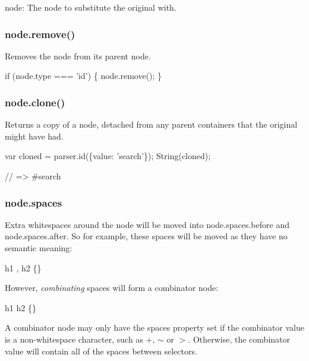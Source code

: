\begin{DoxyItemize}
\item {\ttfamily node}\+: The node to substitute the original with.
\end{DoxyItemize}

\subsubsection*{{\ttfamily node.\+remove()}}

Removes the node from its parent node.


\begin{DoxyCode}
if (node.type === 'id') \{
    node.remove();
\}
\end{DoxyCode}


\subsubsection*{{\ttfamily node.\+clone()}}

Returns a copy of a node, detached from any parent containers that the original might have had.


\begin{DoxyCode}
var cloned = parser.id(\{value: 'search'\});
String(cloned);

// => #search
\end{DoxyCode}


\subsubsection*{{\ttfamily node.\+spaces}}

Extra whitespaces around the node will be moved into {\ttfamily node.\+spaces.\+before} and {\ttfamily node.\+spaces.\+after}. So for example, these spaces will be moved as they have no semantic meaning\+:


\begin{DoxyCode}
h1     ,     h2   \{\}
\end{DoxyCode}


However, {\itshape combinating} spaces will form a {\ttfamily combinator} node\+:


\begin{DoxyCode}
h1        h2 \{\}
\end{DoxyCode}


A {\ttfamily combinator} node may only have the {\ttfamily spaces} property set if the combinator value is a non-\/whitespace character, such as {\ttfamily +}, {\ttfamily $\sim$} or {\ttfamily $>$}. Otherwise, the combinator value will contain all of the spaces between selectors.

